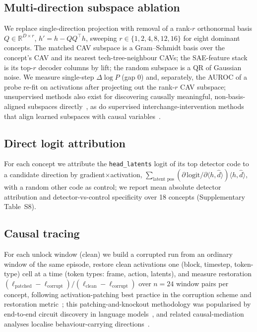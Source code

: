 \documentclass[pdflatex,sn-mathphys-num]{sn-jnl}%
\theoremstyle{thmstyleone}%
\theoremstyle{thmstyletwo}%
\theoremstyle{thmstylethree}%
\begin{document}
\subsection{Multi-direction subspace ablation}\label{m:subspace}
We replace single-direction projection with removal of a rank-$r$ orthonormal basis $Q\in\mathbb{R}^{D\times r}$, $h'=h-QQ^\top h$, sweeping $r\in\{1,2,4,8,12,16\}$ for eight dominant concepts. The matched CAV subspace is a Gram--Schmidt basis over the concept's CAV and its nearest tech-tree-neighbour CAVs; the SAE-feature stack is its top-$r$ decoder columns by lift; the random subspace is a QR of Gaussian noise. We measure single-step $\Delta\log P$ (gap 0) and, separately, the AUROC of a probe re-fit on activations after projecting out the rank-$r$ CAV subspace; unsupervised methods also exist for discovering causally meaningful, non-basis-aligned subspaces directly~\cite{huang2026subspaces}, as do supervised interchange-intervention methods that align learned subspaces with causal variables~\cite{wu2023das}.

\subsection{Direct logit attribution}\label{m:logit}
For each concept we attribute the \texttt{head\_latents} logit of its top detector code to a candidate direction by gradient$\times$activation, $\sum_{\text{latent pos}}(\partial\,\mathrm{logit}/\partial\langle h,\hat d\rangle)\langle h,\hat d\rangle$, with a random other code as control; we report mean absolute detector attribution and detector-vs-control specificity over 18 concepts (Supplementary Table~S8).

\subsection{Causal tracing}\label{m:trace}
For each unlock window (clean) we build a corrupted run from an ordinary window of the same episode, restore clean activations one (block, timestep, token-type) cell at a time (token types: frame, action, latents), and measure restoration $(\ell_{\mathrm{patched}}-\ell_{\mathrm{corrupt}})/(\ell_{\mathrm{clean}}-\ell_{\mathrm{corrupt}})$ over $n{=}24$ window pairs per concept, following activation-patching best practice in the corruption scheme and restoration metric~\cite{zhang2024patching}; this patching-and-knockout methodology was popularised by end-to-end circuit discovery in language models~\cite{wang2023ioi}, and related causal-mediation analyses localise behaviour-carrying directions~\cite{vig2020causal,todd2024functionvectors}.
\end{document}
